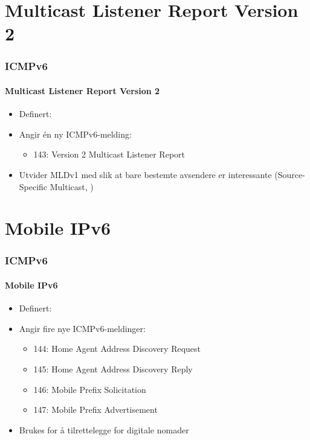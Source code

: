 \section{Multicast Listener Report Version 2}
\begin{frame}%
  \frametitle{ICMPv6}
  \framesubtitle{Multicast Listener Report Version 2}
  \begin{itemize}%
  \item Definert: 
  \item Angir én ny ICMPv6-melding:
    \begin{itemize}%
    \item 143: Version 2 Multicast Listener Report
    \end{itemize}
  \item Utvider MLDv1  med slik at bare bestemte avsendere
    er interessante (Source-Specific Multicast, )
  \end{itemize}
\end{frame}

\section{Mobile IPv6}
\begin{frame}%
  \frametitle{ICMPv6}
  \framesubtitle{Mobile IPv6}
  \begin{itemize}%
  \item Definert: 
  \item Angir fire nye ICMPv6-meldinger:
    \begin{itemize}%
    \item 144: Home Agent Address Discovery Request
    \item 145: Home Agent Address Discovery Reply
    \item 146: Mobile Prefix Solicitation
    \item 147: Mobile Prefix Advertisement
    \end{itemize}
  \item Brukes for å tilrettelegge for digitale nomader
  \end{itemize}
\end{frame}

